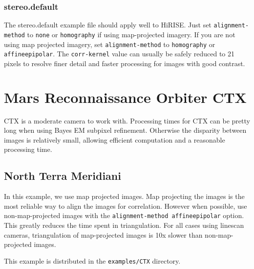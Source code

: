 \subsubsection*{stereo.default}

The stereo.default example file should apply well to HiRISE. Just set
\texttt{alignment-method} to \texttt{none} or \texttt{homography} if
using map-projected imagery. If you are not using map projected
imagery, set \texttt{alignment-method} to \texttt{homography} or
\texttt{affineepipolar}. The \texttt{corr-kernel} value can usually be
safely reduced to 21 pixels to resolve finer detail and faster
processing for images with good contrast.

\vfill

\section{Mars Reconnaissance Orbiter CTX}

\ac{CTX} is a moderate camera to work with. Processing times for
\ac{CTX} can be pretty long when using Bayes EM subpixel
refinement. Otherwise the disparity between images is relatively
small, allowing efficient computation and a reasonable processing time.

\subsection{North Terra Meridiani}


In this example, we use map projected images. Map projecting the
images is the most reliable way to align the images for
correlation. However when possible, use non-map-projected images with
the \texttt{alignment-method affineepipolar} option. This greatly reduces
the time spent in triangulation. For all cases using linescan cameras,
triangulation of map-projected images is 10x slower than
non-map-projected images.

This example is distributed in the \texttt{examples/CTX} directory.

